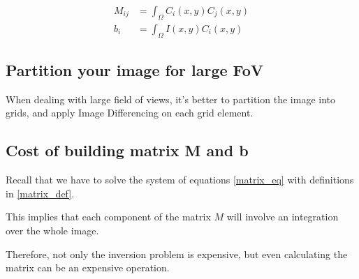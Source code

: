 \begin{align}
M_{ij}  &=   \int_{\Omega}  C_{i}(x,y)  C_{j}(x,y) \\
b_{i} &=  \int_{\Omega} I(x,y) C_{i}(x,y) 
\end{align}

\subsection{Partition your image for large FoV}

When dealing with large field of views, it's better to partition the image into grids, and apply Image Differencing on each grid element.

\subsection*{Cost of building matrix M and b}

Recall that we have to solve the system of equations \eqref{matrix_eq} with definitions in \eqref{matrix_def}.

This implies that each component of the matrix $M$ will involve an integration over the whole image.

Therefore, not only the inversion problem is expensive, but even calculating the matrix can be an expensive operation.

